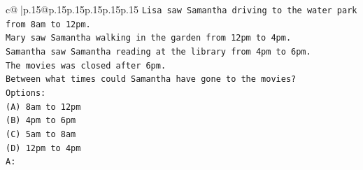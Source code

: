 \documentclass{article}
\begin{document}
{\begin{supertabular}{c@{$\;$}|p{.15\linewidth}@{}p{.15\linewidth}p{.15\linewidth}p{.15\linewidth}p{.15\linewidth}p{.15\linewidth}}
{{{\texttt{Lisa saw Samantha driving to the water park from 8am to 12pm.} \\
\texttt{Mary saw Samantha walking in the garden from 12pm to 4pm.} \\
\texttt{Samantha saw Samantha reading at the library from 4pm to 6pm.} \\
\texttt{The movies was closed after 6pm.} \\
\texttt{Between what times could Samantha have gone to the movies?} \\
\texttt{Options:} \\
\texttt{(A) 8am to 12pm} \\
\texttt{(B) 4pm to 6pm} \\
\texttt{(C) 5am to 8am} \\
\texttt{(D) 12pm to 4pm} \\
\texttt{A:} \\
            }
        }
    }
     \\ \\


\end{supertabular}}
\end{document}
